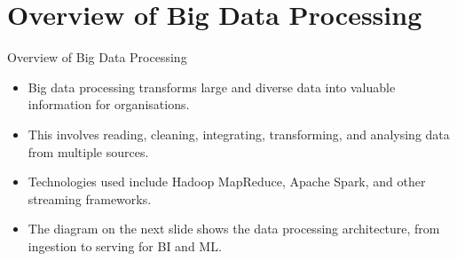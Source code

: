 \documentclass[aspectratio=169, table]{beamer}
\begin{document}
\section{Overview of Big Data Processing}

\begin{frame}{Overview of Big Data Processing}
	\vspace{20pt}
	
	\begin{itemize}
		\item Big data processing transforms large and diverse data into valuable information for organisations.
		
		\item This involves reading, cleaning, integrating, transforming, and analysing data from multiple sources.
		
		\item Technologies used include Hadoop MapReduce, Apache Spark, and other streaming frameworks.
		
		\item The diagram on the next slide shows the data processing architecture, from ingestion to serving for BI and ML.
	\end{itemize}
	
\end{frame}
\end{document}

